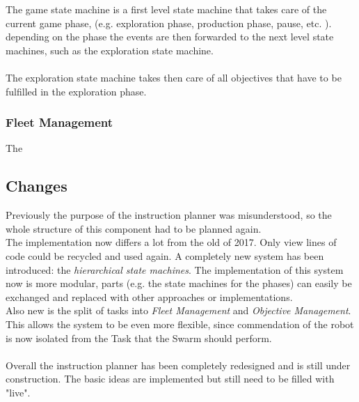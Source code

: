 The game state machine is a first level state machine that takes care of the current
game phase, (e.g. exploration phase, production phase, pause, etc. ). depending on the phase the
events are then forwarded to the next level state machines, such as the exploration state machine. \\
\\
The exploration state machine takes then care of all objectives that have to be fulfilled in the
exploration phase.
\subsubsection{Fleet Management}


The

\subsection{Changes}
Previously the purpose of the instruction planner was misunderstood, so the whole structure of
this component had to be planned again. \\
The implementation now differs a lot from the old of 2017. Only view lines of code could be recycled and used again.
A completely new system has been introduced: the \textit{hierarchical state machines}. The implementation of
this system now is more modular, parts (e.g. the state machines for the phases) can easily be exchanged and
replaced with other approaches or implementations. \\
Also new is the split of tasks into \textit{Fleet Management} and \textit{Objective Management}. This
allows the system to be even more flexible, since commendation of the robot is now isolated from the Task that the
Swarm should perform. \\
\\
Overall the instruction planner has been completely redesigned and is still under construction.
The basic ideas are implemented but still need to be filled with "live".

